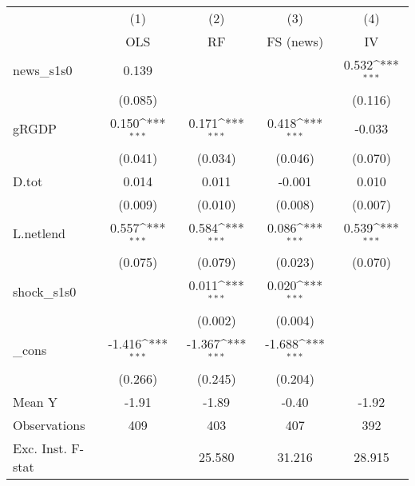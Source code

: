 {
\def\sym#1{\ifmmode^{#1}\else\(^{#1}\)\fi}
\begin{tabular}{l*{4}{c}}
\toprule
            &\multicolumn{1}{c}{(1)}&\multicolumn{1}{c}{(2)}&\multicolumn{1}{c}{(3)}&\multicolumn{1}{c}{(4)}\\
            &\multicolumn{1}{c}{OLS}&\multicolumn{1}{c}{RF}&\multicolumn{1}{c}{FS (news)}&\multicolumn{1}{c}{IV}\\
\midrule
news\_s1s0   &       0.139         &                     &                     &       0.532\sym{***}\\
            &     (0.085)         &                     &                     &     (0.116)         \\
\addlinespace
gRGDP       &       0.150\sym{***}&       0.171\sym{***}&       0.418\sym{***}&      -0.033         \\
            &     (0.041)         &     (0.034)         &     (0.046)         &     (0.070)         \\
\addlinespace
D.tot       &       0.014         &       0.011         &      -0.001         &       0.010         \\
            &     (0.009)         &     (0.010)         &     (0.008)         &     (0.007)         \\
\addlinespace
L.netlend   &       0.557\sym{***}&       0.584\sym{***}&       0.086\sym{***}&       0.539\sym{***}\\
            &     (0.075)         &     (0.079)         &     (0.023)         &     (0.070)         \\
\addlinespace
shock\_s1s0  &                     &       0.011\sym{***}&       0.020\sym{***}&                     \\
            &                     &     (0.002)         &     (0.004)         &                     \\
\addlinespace
\_cons      &      -1.416\sym{***}&      -1.367\sym{***}&      -1.688\sym{***}&                     \\
            &     (0.266)         &     (0.245)         &     (0.204)         &                     \\
\midrule
Mean Y      &       -1.91         &       -1.89         &       -0.40         &       -1.92         \\
Observations&         409         &         403         &         407         &         392         \\
Exc. Inst. F-stat&                     &      25.580         &      31.216         &      28.915         \\
\bottomrule
\end{tabular}
}
